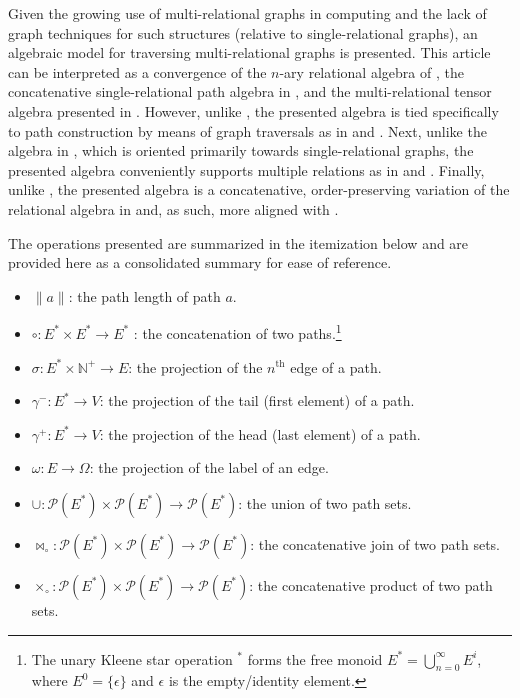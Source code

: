 \documentclass[10pt,conference,letterpaper]{IEEEtran}
\newcommand{\rar}{\rightarrow}
\newcommand{\mbb}{\mathbb}
\newcommand{\mca}{\mathcal}
\newcommand{\join}{\bowtie_\circ}
\newcommand{\disjoin}{\times_\circ}
\begin{document}
Given the growing use of multi-relational graphs in computing \cite{dotslines:rodriguez2010} and the lack of graph techniques for such structures (relative to single-relational graphs), an algebraic model for traversing multi-relational graphs is presented. This article can be interpreted as a convergence of the $n$-ary relational algebra of \cite{rdbms:codd1970}, the concatenative single-relational path algebra in \cite{graphalg:russling1995}, and the multi-relational tensor algebra presented in \cite{pathalg:rodriguez2009}. However, unlike \cite{rdbms:codd1970}, the presented algebra is tied specifically to path construction by means of graph traversals as in \cite{pathalg:rodriguez2009} and \cite{graphalg:russling1995}. Next, unlike the algebra in \cite{graphalg:russling1995}, which is oriented primarily towards single-relational graphs, the presented algebra conveniently supports multiple relations as in \cite{rdbms:codd1970} and \cite{pathalg:rodriguez2009}. Finally, unlike \cite{pathalg:rodriguez2009}, the presented algebra is a concatenative, order-preserving variation of the relational algebra in \cite{rdbms:codd1970} and, as such, more aligned with \cite{graphalg:russling1995}.

The operations presented are summarized in the itemization below and are provided here as a consolidated summary for ease of reference.
\begin{itemize}
	\item $\|a\|$: the path length of path $a$.
	\item $\circ: E^* \times E^* \rar E^*$ : the concatenation of two paths.\footnote{The unary Kleene star operation $^*$ forms the free monoid $E^* = \bigcup_{n=0}^\infty E^i$, where $E^0 = \{\epsilon\}$ and $\epsilon$ is the empty/identity element.}
	\item $\sigma: E^* \times \mbb{N}^+ \rar E$: the projection of the $n^\text{th}$ edge of a path.
	\item $\gamma^-: E^* \rar V$: the projection of the tail (first element) of a path.
	\item $\gamma^+: E^* \rar V$: the projection of the head (last element) of a path.
	\item $\omega : E \rar \Omega$: the projection of the label of an edge.
	\item $\cup: \mca{P}(E^*) \times \mca{P}(E^*) \rar \mca{P}(E^*)$: the union of two path sets.
	\item $\join: \mca{P}(E^*) \times \mca{P}(E^*) \rar \mca{P}(E^*)$: the concatenative join of two path sets.
	\item $\disjoin : \mca{P}(E^*) \times \mca{P}(E^*) \rar \mca{P}(E^*)$: the concatenative product of two path sets.
\end{itemize}
\end{document}

